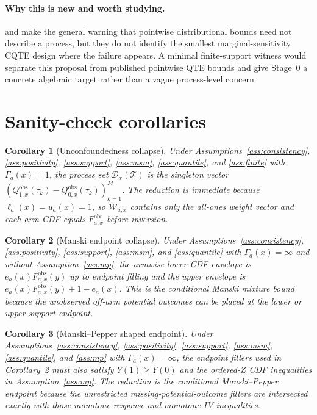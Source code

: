 \documentclass[11pt]{article}
\theoremstyle{definition}
\theoremstyle{plain}
\newtheorem{corollary}{Corollary}
\theoremstyle{remark}
\begin{document}
\paragraph{Why this is new and worth studying.}
\citet{FanPark2010} and \citet{FirpoRidder2019} make the general warning that pointwise distributional bounds need not describe a process, but they do not identify the smallest marginal-sensitivity CQTE design where the failure appears.  A minimal finite-support witness would separate this proposal from published pointwise QTE bounds and give Stage~0 a concrete algebraic target rather than a vague process-level concern.

\section{Sanity-check corollaries}
\begin{corollary}[Unconfoundedness collapse]\label{cor:unconfounded}
Under Assumptions~\ref{ass:consistency}, \ref{ass:positivity}, \ref{ass:support}, \ref{ass:msm}, \ref{ass:quantile}, and \ref{ass:finite} with \(\Gamma_a(x)=1\), the process set \(\mathcal{D}_x(\mathcal{T})\) is the singleton vector \((Q^{\mathrm{obs}}_{1,x}(\tau_k)-Q^{\mathrm{obs}}_{0,x}(\tau_k))_{k=1}^M\).  The reduction is immediate because \(\ell_a(x)=u_a(x)=1\), so \(\mathcal{W}_{a,x}\) contains only the all-ones weight vector and each arm CDF equals \(F^{\mathrm{obs}}_{a,x}\) before inversion.
\end{corollary}

\begin{corollary}[Manski endpoint collapse]\label{cor:manski}
Under Assumptions~\ref{ass:consistency}, \ref{ass:positivity}, \ref{ass:support}, \ref{ass:msm}, and \ref{ass:quantile} with \(\Gamma_a(x)=\infty\) and without Assumption~\ref{ass:mp}, the armwise lower CDF envelope is \(e_a(x)F^{\mathrm{obs}}_{a,x}(y)\) up to endpoint filling and the upper envelope is \(e_a(x)F^{\mathrm{obs}}_{a,x}(y)+1-e_a(x)\).  This is the conditional Manski mixture bound because the unobserved off-arm potential outcomes can be placed at the lower or upper support endpoint.
\end{corollary}

\begin{corollary}[Manski--Pepper shaped endpoint]\label{cor:mp-shaped}
Under Assumptions~\ref{ass:consistency}, \ref{ass:positivity}, \ref{ass:support}, \ref{ass:msm}, \ref{ass:quantile}, and \ref{ass:mp} with \(\Gamma_a(x)=\infty\), the endpoint fillers used in Corollary~\ref{cor:manski} must also satisfy \(Y(1)\ge Y(0)\) and the ordered-\(Z\) CDF inequalities in Assumption~\ref{ass:mp}.  The reduction is the conditional Manski--Pepper endpoint because the unrestricted missing-potential-outcome fillers are intersected exactly with those monotone response and monotone-IV inequalities.
\end{corollary}
\end{document}
